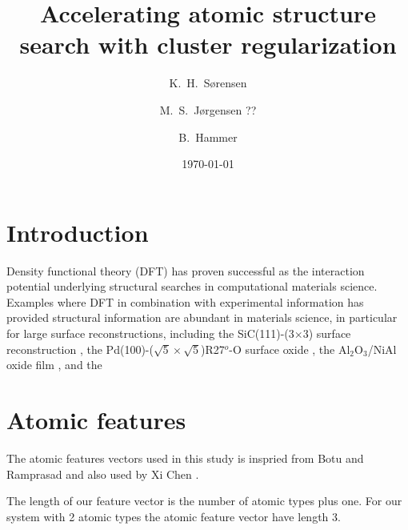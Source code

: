 \documentclass[%
 aps,
 prl,%
 amsmath,amssymb,
 reprint,%
]{revtex4-1}
\begin{document}
\title[]{Accelerating atomic structure search with cluster regularization}%

\author{K.\ H.\ S{\o}rensen}
\author{M.\ S.\ J{\o}rgensen ??}
\author{B.\ Hammer}
 
\date{\today}%

\begin{abstract}
\end{abstract}

\keywords{}%
\maketitle

\section{\label{sec:introduction}Introduction}
Density functional theory (DFT) has proven successful as the
interaction potential underlying structural searches in computational
materials science. Examples where DFT in combination with experimental information
has provided structural information are abundant in materials science, in particular
for large surface reconstructions, including the SiC(111)-(3$\times$3) surface reconstruction \cite{Starke1998}, the Pd(100)-($\sqrt{5}\times \sqrt{5}$)R27$^o$-O surface oxide \cite{Todorova2003}, the Al$_2$O$_3$/NiAl oxide film \cite{Kresse2005}, and the


\section{Atomic features}
 
The atomic features vectors used in this study is inspried from Botu and Ramprasad \cite{Boto2015} and also used by Xi Chen \cite{Chen2017}.

The length of our feature vector is the number of atomic types plus one. For our system with 2 atomic types the atomic feature vector have length 3.
\end{document}
